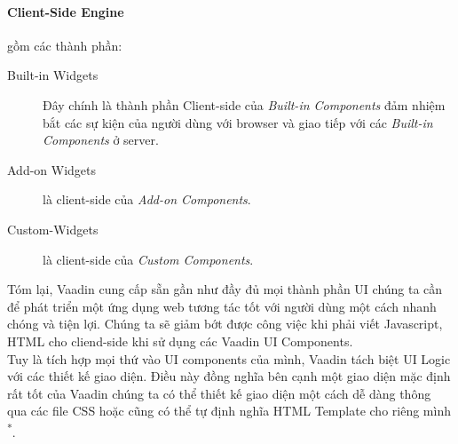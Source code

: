 \paragraph{Client-Side Engine} gồm các thành phần:
\begin{description}
	\item[Built-in Widgets] Đây chính là thành phần Client-side của \textit{Built-in Components} đảm nhiệm bắt các sự kiện của người dùng với browser và giao tiếp với các \textit{Built-in Components} ở server.
	\item[Add-on Widgets] là client-side của \textit{Add-on Components}.
	\item[Custom-Widgets] là client-side của \textit{Custom Components}.
\end{description}

Tóm lại, Vaadin cung cấp sẵn gần như đầy đủ mọi thành phần UI chúng ta cần để phát triển một ứng dụng web tương tác tốt với người dùng một cách nhanh chóng và tiện lợi. Chúng ta sẽ giảm bớt được công việc khi phải viết Javascript, HTML cho cliend-side khi sử dụng các Vaadin UI Components.
\\
Tuy là tích hợp mọi thứ vào UI components của mình, Vaadin tách biệt UI Logic với các thiết kế giao diện. Điều này đồng nghĩa bên cạnh một giao diện mặc định rất tốt của Vaadin chúng ta có thể thiết kế giao diện một cách dễ dàng thông qua các file CSS hoặc cũng có thể tự định nghĩa HTML Template cho riêng mình \textsuperscript{*}. 
{\let\thefootnote\relax{}
}
